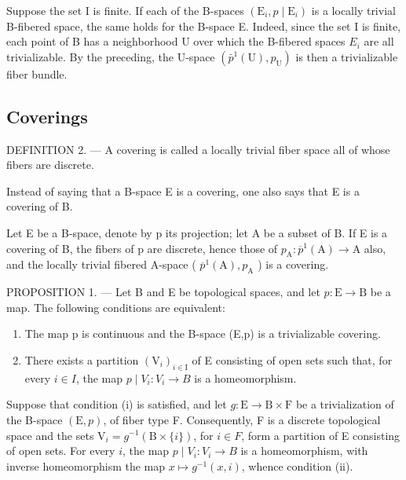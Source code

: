 Suppose the set I is finite. If each of the B-spaces \((\mathrm{E}_{i}, p \mid \mathrm{E}_{i})\) is a locally trivial B-fibered space, the same holds for the B-space E. Indeed, since the set I is finite, each point of B has a neighborhood U over which the B-fibered spaces \(E_{i}\) are all trivializable. By the preceding, the U-space \((\bar{p}^{1}(\mathrm{U}), p_{\mathrm{U}})\) is then a trivializable fiber bundle.

\subsection{Coverings}

DEFINITION 2. --- A covering is called a locally trivial fiber space all of whose fibers are discrete.

Instead of saying that a B-space E is a covering, one also says that E is a covering of B.

Let E be a B-space, denote by p its projection; let A be a subset of B. If E is a covering of B, the fibers of p are discrete, hence those of \(p_{\mathrm{A}} \colon \overline{p}^{1}(\mathrm{A}) \to \mathrm{A}\) also, and the locally trivial fibered A-space ( \(\overline{p}^{1}(\mathrm{A}), p_{\mathrm{A}}\) ) is a covering.

PROPOSITION 1. --- Let B and E be topological spaces, and let \(p\colon \mathrm{E}\to \mathrm{B}\) be a map. The following conditions are equivalent:

\begin{enumerate}
\def\labelenumi{(\roman{enumi})}
\item
  The map p is continuous and the B-space (E,p) is a trivializable covering.
\item
  There exists a partition \((\mathrm{V}_{i})_{i\in\mathrm{I}}\) of E consisting of open sets such that, for every \(i\in I\), the map \(p\mid V_{i}\colon V_{i}\to B\) is a homeomorphism.
\end{enumerate}

Suppose that condition (i) is satisfied, and let \(g \colon \mathrm{E} \to \mathrm{B} \times \mathrm{F}\) be a trivialization of the B-space \((\mathrm{E}, p)\), of fiber type F. Consequently, F is a discrete topological space and the sets \(\mathrm{V}_i = g^{-1}(\mathrm{B} \times \{i\})\), for \(i \in F\), form a partition of E consisting of open sets. For every \(i\), the map \(p \mid V_i \colon V_i \to B\) is a homeomorphism, with inverse homeomorphism the map \(x \mapsto g^{-1}(x, i)\), whence condition (ii).

